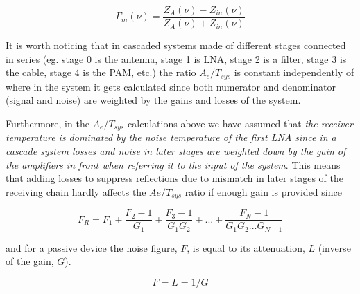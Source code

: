 \documentclass[11pt]{article}
\begin{document}
\begin{equation}
\Gamma_{m}(\nu) = \frac{Z_A(\nu)-Z_{in}(\nu)}{Z_A(\nu)+Z_{in}(\nu)} 
\end{equation}

It is worth noticing that in cascaded systems made of different stages connected in series (eg. stage 0 is the antenna, stage 1 is LNA, stage 2 is a filter, stage 3 is the cable, stage 4 is the PAM, etc.) the ratio $A_e/T_{sys}$ is constant independently of where in the system it gets calculated since both numerator and denominator (signal and noise) are weighted by the gains and losses of the system.

Furthermore, in the $A_{e}/T_{sys}$ calculations above we have assumed that {\em the receiver temperature is dominated by the noise temperature of the first LNA since in a cascade system losses and noise in later stages are weighted down by the gain of the amplifiers in front when referring it to the input of the system}. This means that adding losses to suppress reflections due to mismatch in later stages of the receiving chain hardly affects the $Ae/T_{sys}$ ratio if enough gain is provided since

\begin{equation}
F_R = F_1 + \frac{F_2-1}{G_1}+\frac{F_3-1}{G_1G_2}+...+\frac{F_N-1}{G_1G_2...G_{N-1}}
\end{equation}

and for a passive device the noise figure, $F$, is equal to its attenuation, $L$ (inverse of the gain, $G$).

 \begin{equation}
F = L = 1/G
\end{equation}

%


%
%

\end{document}

